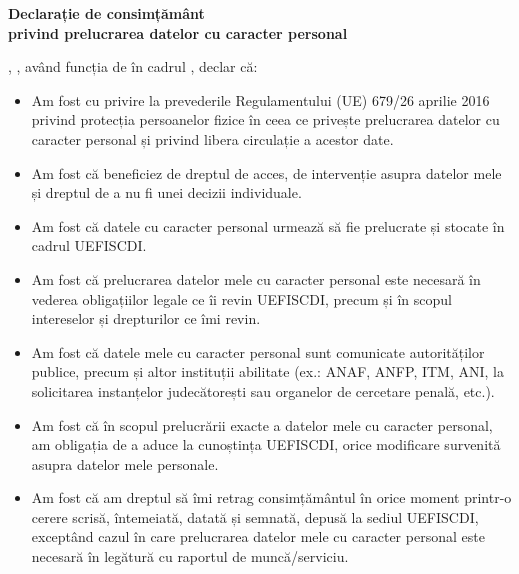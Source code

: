 \documentclass[draftproposal,pncdiform,masculine]{pncdi-pd}
\begin{document}

\vspace*{2em}

\begin{center}
\textbf{Declarație de consimțământ \\
privind prelucrarea datelor cu caracter personal}
\end{center}

, \placeholder*[15]{}, având funcția de \placeholder*[9]{}
în cadrul \placeholder*[15]{}, declar că:
\begin{itemize}[leftmargin=*]
\item
Am fost  cu privire la prevederile Regulamentului (UE) 679/26 aprilie 2016 privind
protecția persoanelor fizice în ceea ce privește prelucrarea datelor cu caracter personal
și privind libera circulație a acestor date.

\item
Am fost  că beneficiez de dreptul de acces, de intervenție
asupra datelor mele și dreptul de a nu fi  unei decizii individuale.

\item
Am fost  că datele cu caracter personal urmează să fie
prelucrate și stocate în cadrul UEFISCDI.

\item
Am fost  că prelucrarea datelor mele cu caracter personal
este necesară în vederea obligațiilor legale ce îi revin UEFISCDI, precum și în scopul
intereselor și drepturilor ce îmi revin.

\item
Am fost  că datele mele cu caracter personal sunt comunicate
autorităților publice, precum și altor instituții abilitate (ex.: ANAF, ANFP, ITM, ANI,
la solicitarea instanțelor judecătorești sau organelor de cercetare penală, etc.).

\item
Am fost  că în scopul prelucrării exacte a datelor mele cu
caracter personal, am obligația de a aduce la cunoștința UEFISCDI, orice modificare
survenită asupra datelor mele personale.

\item
Am fost  că am dreptul să îmi retrag consimțământul în
orice moment printr-o cerere scrisă, întemeiată, datată și semnată, depusă la sediul
UEFISCDI, exceptând cazul în care prelucrarea datelor mele cu caracter personal este
necesară în legătură cu raportul de muncă/serviciu.
\end{itemize}
\end{document}

